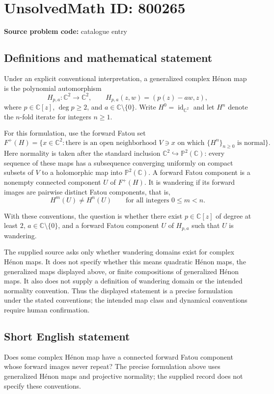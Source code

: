 \documentclass[11pt]{article}
\newcommand{\C}{\mathbb{C}}
\newcommand{\PP}{\mathbb{P}}
\begin{document}
\section*{UnsolvedMath ID: 800265}
\textbf{Source problem code:} catalogue entry
\subsection{Definitions and mathematical statement}
Under an explicit conventional interpretation, a generalized complex Hénon map is the polynomial automorphism
\[
H_{p,a}\colon\C^2\longrightarrow\C^2,\qquad H_{p,a}(z,w)=(p(z)-aw,z),
\]
where \(p\in\C[z]\), \(\deg p\geq2\), and \(a\in\C\setminus\{0\}\). Write \(H^0=\operatorname{id}_{\C^2}\) and let \(H^n\) denote the \(n\)-fold iterate for integers \(n\geq1\).

For this formulation, use the forward Fatou set
\[
F^+(H)=\{x\in\C^2:\text{there is an open neighborhood }V\ni x\text{ on which }\{H^n\}_{n\geq0}\text{ is normal}\}.
\]
Here normality is taken after the standard inclusion \(\C^2\hookrightarrow\PP^2(\C)\): every sequence of these maps has a subsequence converging uniformly on compact subsets of \(V\) to a holomorphic map into \(\PP^2(\C)\). A forward Fatou component is a nonempty connected component \(U\) of \(F^+(H)\). It is wandering if its forward images are pairwise distinct Fatou components, that is,
\[
H^m(U)\neq H^n(U)\qquad\text{for all integers }0\leq m<n.
\]

With these conventions, the question is whether there exist \(p\in\C[z]\) of degree at least \(2\), \(a\in\C\setminus\{0\}\), and a forward Fatou component \(U\) of \(H_{p,a}\) such that \(U\) is wandering.

The supplied source asks only whether wandering domains exist for complex Hénon maps. It does not specify whether this means quadratic Hénon maps, the generalized maps displayed above, or finite compositions of generalized Hénon maps. It also does not supply a definition of wandering domain or the intended normality convention. Thus the displayed statement is a precise formulation under the stated conventions; the intended map class and dynamical conventions require human confirmation.
\subsection{Short English statement}
Does some complex Hénon map have a connected forward Fatou component whose forward images never repeat? The precise formulation above uses generalized Hénon maps and projective normality; the supplied record does not specify these conventions.
\end{document}
